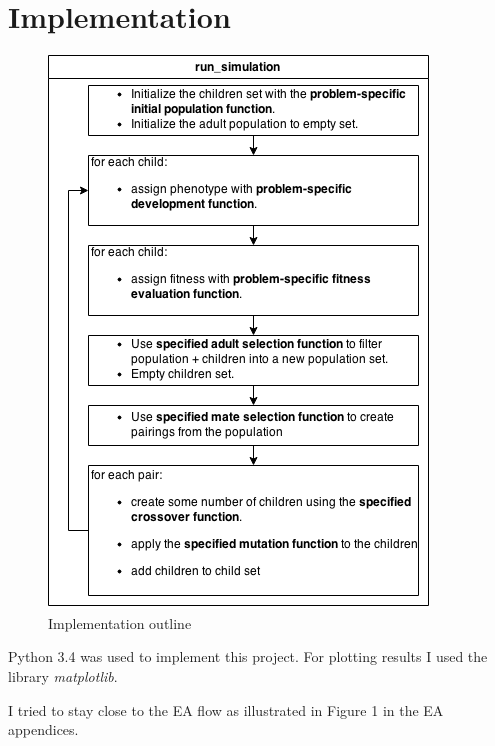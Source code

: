 \section*{Implementation}
\begin{figure}[width=\textwidth]
    \begin{centering}
        \vspace{-.8cm}
        \includegraphics[width=0.9\linewidth]{img/EA-loop.png}
        \caption{Implementation outline}
        \label{evo-loop}
    \end{centering}
\end{figure}

Python 3.4 was used to implement this project.
For plotting results I used the library \textit{matplotlib}.

I tried to stay close to the EA flow as illustrated in Figure 1 in the EA appendices\cite{ea-appendices}.

